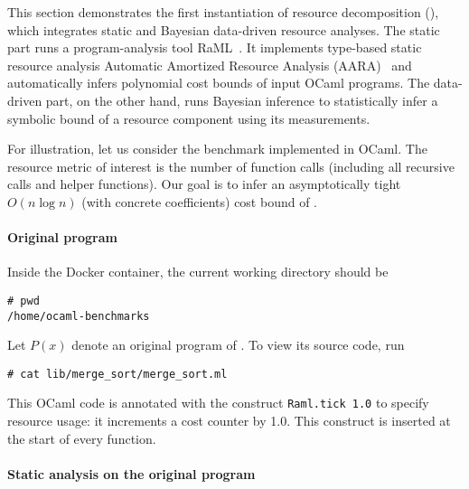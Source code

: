 This section demonstrates the first instantiation of resource decomposition
(), which integrates static and Bayesian
data-driven resource analyses.
%
The static part runs a program-analysis tool RaML~\citep{RaML}.
%
It implements type-based static resource analysis Automatic Amortized Resource
Analysis (AARA)~\citep{Hoffmann2011a,Hoffmann2017} and automatically infers
polynomial cost bounds of input OCaml programs.
%
The data-driven part, on the other hand, runs Bayesian inference to
statistically infer a symbolic bound of a resource component using its
measurements.

For illustration, let us consider the benchmark \mergesort{} implemented in
OCaml.
%
The resource metric of interest is the number of function calls (including all
recursive calls and helper functions).
%
Our goal is to infer an asymptotically tight $O (n \log n)$ (with concrete
coefficients) cost bound of \mergesort{}.

\paragraph{Original program}

Inside the Docker container, the current working directory should be
\begin{verbatim}
# pwd
/home/ocaml-benchmarks
\end{verbatim}
%
Let $P(x)$ denote an original program of \mergesort{}.
%
To view its source code, run
\begin{verbatim}
# cat lib/merge_sort/merge_sort.ml
\end{verbatim}
%
This OCaml code is annotated with the construct \texttt{Raml.tick 1.0} to
specify resource usage: it increments a cost counter by 1.0.
%
This construct is inserted at the start of every function.

\paragraph{Static analysis on the original program}

